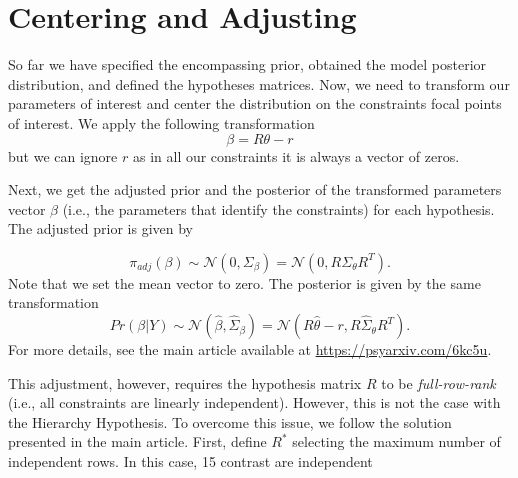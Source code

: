 \documentclass[
]{book}
\begin{document}
\hypertarget{centering-and-adjusting}{%
\section{Centering and Adjusting}\label{centering-and-adjusting}}

So far we have specified the encompassing prior, obtained the model posterior distribution, and defined the hypotheses matrices. Now, we need to transform our parameters of interest and center the distribution on the constraints focal points of interest. We apply the following transformation
\[
\beta = R\theta - r
\]
but we can ignore \(r\) as in all our constraints it is always a vector of zeros.

Next, we get the adjusted prior and the posterior of the transformed parameters vector \(\beta\) (i.e., the parameters that identify the constraints) for each hypothesis. The adjusted prior is given by

\[
\pi_{adj}(\beta) \sim \mathcal{N}(0, \Sigma_{\beta}) = \mathcal{N}(0, R\Sigma_{\theta}R^T).
\]
Note that we set the mean vector to zero. The posterior is given by the same transformation
\[
Pr(\beta|Y) \sim \mathcal{N}(\hat{\beta}, \hat{\Sigma}_{\beta}) = \mathcal{N}(R\hat{\theta}-r, R\hat{\Sigma}_{\theta}R^T).
\]
For more details, see the main article available at \url{https://psyarxiv.com/6kc5u}.

This adjustment, however, requires the hypothesis matrix \(R\) to be \emph{full-row-rank} (i.e., all constraints are linearly independent). However, this is not the case with the Hierarchy Hypothesis. To overcome this issue, we follow the solution presented in the main article. First, define \(R^*\) selecting the maximum number of independent rows. In this case, 15 contrast are independent
\end{document}
